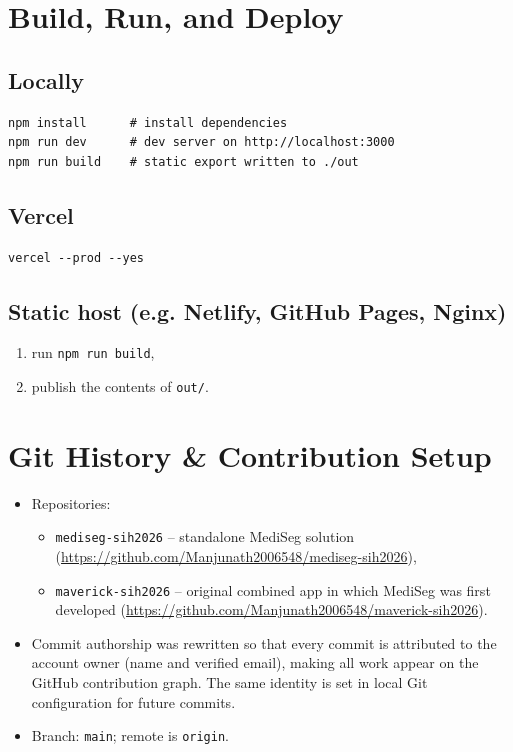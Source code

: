 \documentclass[11pt, a4paper]{article}
\begin{document}
\section{Build, Run, and Deploy}

\subsection{Locally}
\begin{lstlisting}[style=cmd]
npm install      # install dependencies
npm run dev      # dev server on http://localhost:3000
npm run build    # static export written to ./out
\end{lstlisting}

\subsection{Vercel}
\begin{lstlisting}[style=cmd]
vercel --prod --yes
\end{lstlisting}

\subsection{Static host (e.g. Netlify, GitHub Pages, Nginx)}
\begin{enumerate}[leftmargin=1.6em, itemsep=2pt]
  \item run \texttt{npm run build},
  \item publish the contents of \texttt{out/}.
\end{enumerate}

\section{Git History \& Contribution Setup}

\begin{itemize}[leftmargin=1.6em, itemsep=2pt]
  \item Repositories:
    \begin{itemize}[leftmargin=1.6em, itemsep=2pt]
      \item \texttt{mediseg-sih2026} -- standalone MediSeg solution
            (\url{https://github.com/Manjunath2006548/mediseg-sih2026}),
      \item \texttt{maverick-sih2026} -- original combined app in which
            MediSeg was first developed
            (\url{https://github.com/Manjunath2006548/maverick-sih2026}).
    \end{itemize}
  \item Commit authorship was rewritten so that every commit is attributed to
        the account owner (name and verified email), making all work appear on
        the GitHub contribution graph. The same identity is set in local Git
        configuration for future commits.
  \item Branch: \texttt{main}; remote is \texttt{origin}.
\end{itemize}
\end{document}
